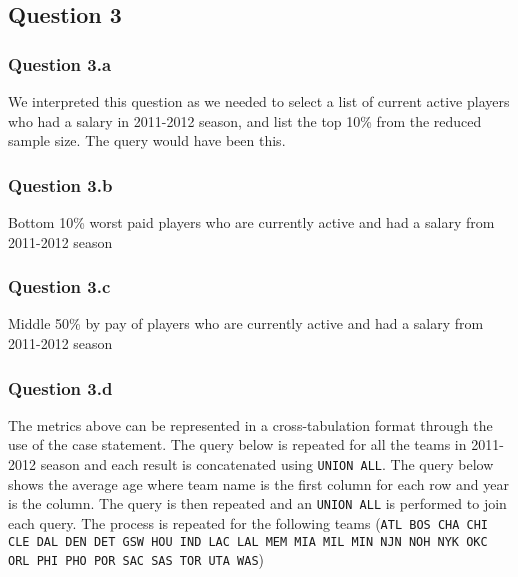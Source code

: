 
\subsection{Question 3}
\label{subsec:413}

\subsubsection{Question 3.a}
\label{subsubsec:413a}
We interpreted this question as we needed to select a list of current active players who had a salary in 2011-2012 season, and list the top 10\% from the reduced sample size. The query would have been this.

\subsubsection{Question 3.b}
\label{subsubsec:413b}
Bottom 10\% worst paid players who are currently active and had a salary from 2011-2012 season

\subsubsection{Question 3.c}
\label{subsubsec:413c}
Middle 50\% by pay of players who are currently active and had a salary from 2011-2012 season

\subsubsection{Question 3.d}
\label{subsubsec:413d}
The metrics above can be represented in a cross-tabulation format through the use of the case statement. The query below is repeated for all the teams in 2011-2012 season and each result is concatenated using \verb|UNION ALL|.
The query below shows the average age where team name is the first column for each row and year is the column. The query is then repeated and an \verb|UNION ALL| is performed to join each query. The process is repeated for the following teams (\verb|ATL BOS CHA CHI CLE DAL DEN DET GSW HOU IND LAC LAL MEM MIA MIL MIN NJN NOH NYK OKC ORL PHI PHO POR SAC SAS TOR UTA WAS|)
